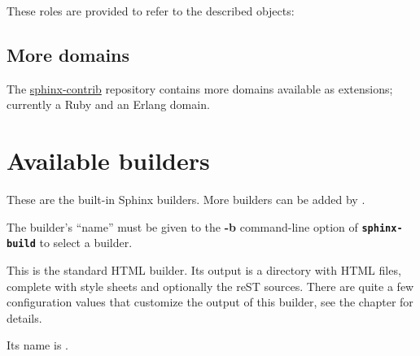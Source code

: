 \documentclass[letterpaper,10pt,english]{sphinxmanual}
\begin{document}
\label{domains:rst-roles}
These roles are provided to refer to the described objects:

\begin{fulllineitems}
\label{domains:role-rst:dir}\label{domains:role-rst:role}
\end{fulllineitems}



\section{More domains}
\label{domains:more-domains}
The \href{https://bitbucket.org/birkenfeld/sphinx-contrib/}{sphinx-contrib} repository contains more domains available as extensions;
currently a Ruby and an Erlang domain.


\chapter{Available builders}
\label{builders:module-sphinx.builders}\label{builders:builders}\label{builders:sphinx-contrib}\label{builders:available-builders}\label{builders::doc}
These are the built-in Sphinx builders.  More builders can be added by
{\hyperref[extensions:extensions]{}}.

The builder's ``name'' must be given to the \textbf{-b} command-line option of
\textbf{\texttt{sphinx-build}} to select a builder.
\label{builders:module-sphinx.builders.html}

\begin{fulllineitems}
\label{builders:sphinx.builders.html.StandaloneHTMLBuilder}
This is the standard HTML builder.  Its output is a directory with HTML
files, complete with style sheets and optionally the reST sources.  There are
quite a few configuration values that customize the output of this builder,
see the chapter {\hyperref[config:html\string-options]{}} for details.

Its name is .

\end{fulllineitems}
\end{document}
